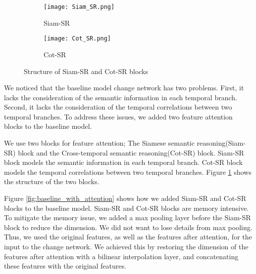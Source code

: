 \documentclass[../main.tex]{subfiles}
\begin{document}
\begin{figure}[h]
    \centering
    \begin{subfigure}[b]{0.1575\linewidth}
        \texttt{[image: Siam\_SR.png]}
        \caption{Siam-SR}
    \end{subfigure}
    \hspace{0.1\textwidth}
    \begin{subfigure}[b]{0.3\linewidth}
        \texttt{[image: Cot\_SR.png]}
        \caption{Cot-SR}
    \end{subfigure}
    \caption{Structure of Siam-SR and Cot-SR blocks\cite{Ding_2022_Bi_SRNet}}
    \label{fig:attention_blocks}
\end{figure}

We noticed that the baseline model change network has two problems. First, it lacks the consideration of the semantic information in each temporal branch. Second, it lacks the consideration of the temporal correlations between two temporal branches. To address these issues, we added two feature attention blocks to the baseline model.

We use two blocks for feature attention; The Siamese semantic reasoning(Siam-SR) block and the Cross-temporal semantic reasoning(Cot-SR) block. Siam-SR block models the semantic information in each temporal branch. Cot-SR block models the temporal correlations between two temporal branches\cite{Ding_2022_Bi_SRNet}. Figure \ref{fig:attention_blocks} shows the structure of the two blocks.

Figure \ref{fig:baseline_with_attention} shows how we added Siam-SR and Cot-SR blocks to the baseline model. Siam-SR and Cot-SR blocks are memory intensive. To mitigate the memory issue, we added a max pooling layer before the Siam-SR block to reduce the dimension. We did not want to lose details from max pooling. Thus, we used the original features, as well as the features after attention, for the input to the change network. We achieved this by restoring the dimension of the features after attention with a bilinear interpolation layer, and concatenating these features with the original features.
\end{document}
